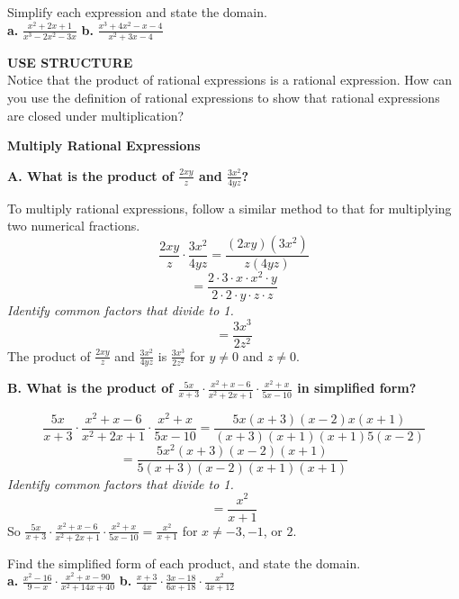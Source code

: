 \documentclass{article}
\newenvironment{concept-box}{}{}
\newenvironment{example}[1]{}{}
\newenvironment{tryit}[1]{}{}
\begin{document}
\begin{tryit}{2}
Simplify each expression and state the domain. \\
\textbf{a.} $\frac{x^2 + 2x + 1}{x^3 - 2x^2 - 3x}$ \qquad \textbf{b.} $\frac{x^3 + 4x^2 - x - 4}{x^2 + 3x - 4}$
\end{tryit}

\begin{concept-box}
\textbf{USE STRUCTURE} \\
Notice that the product of rational expressions is a rational expression. How can you use the definition of rational expressions to show that rational expressions are closed under multiplication?
\end{concept-box}

\begin{example}{3}
\textbf{Multiply Rational Expressions}

\textbf{A. What is the product of $\frac{2xy}{z}$ and $\frac{3x^2}{4yz}$?}

To multiply rational expressions, follow a similar method to that for multiplying two numerical fractions.
$$ \frac{2xy}{z} \cdot \frac{3x^2}{4yz} = \frac{(2xy)(3x^2)}{z(4yz)} $$
$$ = \frac{2 \cdot 3 \cdot x \cdot x^2 \cdot y}{2 \cdot 2 \cdot y \cdot z \cdot z} $$
\emph{Identify common factors that divide to 1.}
$$ = \frac{3x^3}{2z^2} $$
The product of $\frac{2xy}{z}$ and $\frac{3x^2}{4yz}$ is $\frac{3x^3}{2z^2}$ for $y \neq 0$ and $z \neq 0$.

\textbf{B. What is the product of $\frac{5x}{x + 3} \cdot \frac{x^2 + x - 6}{x^2 + 2x + 1} \cdot \frac{x^2 + x}{5x - 10}$ in simplified form?}

$$ \frac{5x}{x + 3} \cdot \frac{x^2 + x - 6}{x^2 + 2x + 1} \cdot \frac{x^2 + x}{5x - 10} = \frac{5x(x + 3)(x - 2)x(x + 1)}{(x + 3)(x + 1)(x + 1)5(x - 2)} $$
$$ = \frac{5x^2(x + 3)(x - 2)(x + 1)}{5(x + 3)(x - 2)(x + 1)(x + 1)} $$
\emph{Identify common factors that divide to 1.}
$$ = \frac{x^2}{x + 1} $$
So $\frac{5x}{x + 3} \cdot \frac{x^2 + x - 6}{x^2 + 2x + 1} \cdot \frac{x^2 + x}{5x - 10} = \frac{x^2}{x + 1}$ for $x \neq -3, -1$, or $2$.
\end{example}

\begin{tryit}{3}
Find the simplified form of each product, and state the domain. \\
\textbf{a.} $\frac{x^2 - 16}{9 - x} \cdot \frac{x^2 + x - 90}{x^2 + 14x + 40}$ \qquad \textbf{b.} $\frac{x + 3}{4x} \cdot \frac{3x - 18}{6x + 18} \cdot \frac{x^2}{4x + 12}$
\end{tryit}
\end{document}
